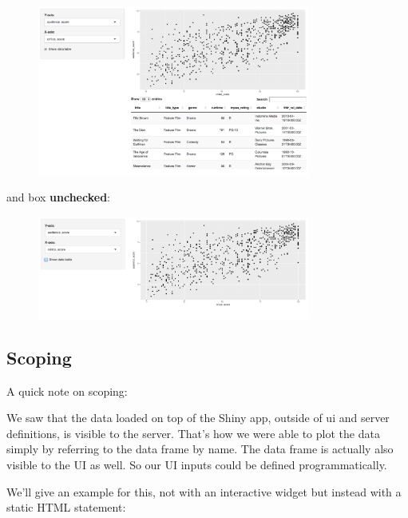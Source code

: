 \documentclass[
  letterpaper,
  DIV=11,
  numbers=noendperiod]{scrreprt}
\begin{document}
\begin{figure}

{\centering \includegraphics[width=0.8\textwidth,height=\textheight]{./images/app-datatable-checked.png}

}

\end{figure}

and box \textbf{unchecked}:

\begin{figure}

{\centering \includegraphics[width=0.8\textwidth,height=\textheight]{./images/app-datatable-unchecked.png}

}

\end{figure}

\hypertarget{scoping}{%
\subsection{Scoping}\label{scoping}}

A quick note on scoping:

We saw that the data loaded on top of the Shiny app, outside of ui and
server definitions, is visible to the server. That's how we were able to
plot the data simply by referring to the data frame by name. The data
frame is actually also visible to the UI as well. So our UI inputs could
be defined programmatically.

We'll give an example for this, not with an interactive widget but
instead with a static HTML statement:
\end{document}
